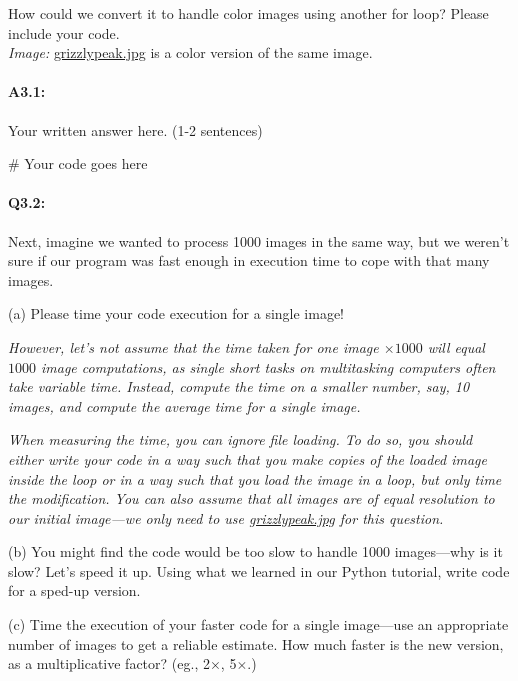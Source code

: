 \documentclass[11pt]{article}
\begin{document}
How could we convert it to handle color images using another for loop? Please include your code. \\

\emph{Image:} \href{grizzlypeak.jpg}{grizzlypeak.jpg} is a color version of the same image.

\paragraph{A3.1:} Your written answer here. (1-2 sentences)
\begin{python}
# Your code goes here
\end{python}



\pagebreak
\paragraph{Q3.2:} Next, imagine we wanted to process 1000 images in the same way, but we weren't sure if our program was fast enough in execution time to cope with that many images. 

(a) Please time your code execution for a single image!

\emph{However, let's not assume that the time taken for one image $\times1000$ will equal $1000$ image computations, as single short tasks on multitasking computers often take variable time. Instead, compute the time on a smaller number, say, 10 images, and compute the average time for a single image.}

\emph{When measuring the time, you can ignore file loading. To do so, you should either write your code in a way such that you make copies of the loaded image inside the loop or in a way such that you load the image in a loop, but only time the modification. You can also assume that all images are of equal resolution to our initial image---we only need to use \href{grizzlypeak.jpg}{grizzlypeak.jpg} for this question.}

(b) You might find the code would be too slow to handle 1000 images---why is it slow? Let's speed it up. Using what we learned in our Python tutorial, write code for a sped-up version.

(c) Time the execution of your faster code for a single image---use an appropriate number of images to get a reliable estimate. How much faster is the new version, as a multiplicative factor? (eg., 2$\times$, 5$\times$.)
\end{document}
